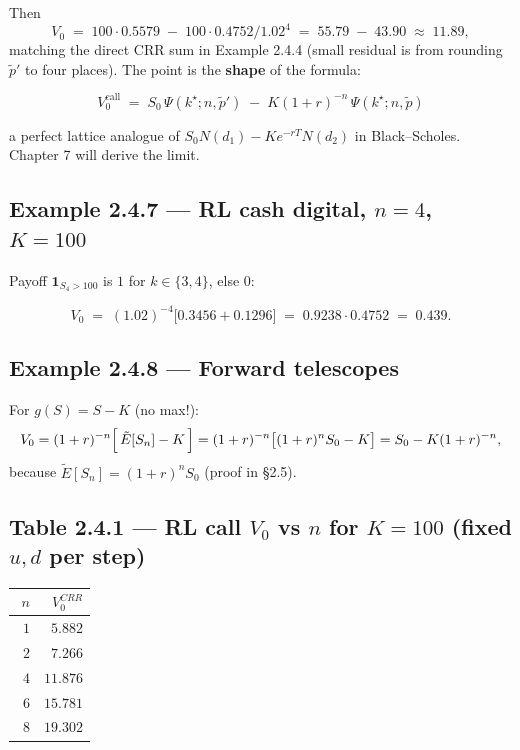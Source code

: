 \documentclass[
  10pt,
  twoside]{book}
\newcounter{none} %
\begin{document}
Then \[
V_0 \;=\; 100\cdot 0.5579 \;-\; 100\cdot 0.4752/1.02^4 \;=\; 55.79 \;-\; 43.90 \;\approx\; 11.89,
\] matching the direct CRR sum in Example 2.4.4 (small residual is from
rounding \(\tilde p'\) to four places). The point is the \textbf{shape}
of the formula:

\[
\boxed{\;V_0^{\text{call}} \;=\; S_0\,\Psi(k^\star; n, \tilde p') \;-\; K(1+r)^{-n}\,\Psi(k^\star; n, \tilde p)\;}
\]

a perfect lattice analogue of \(S_0 N(d_1) - Ke^{-rT}N(d_2)\) in
Black--Scholes. Chapter 7 will derive the limit.

\subsection{\texorpdfstring{Example 2.4.7 --- RL cash digital, \(n=4\),
\(K=100\)}{Example 2.4.7 --- RL cash digital, n=4, K=100}}\label{example-2.4.7-rl-cash-digital-n4-k100}

Payoff \(\mathbf 1_{S_4>100}\) is \(1\) for \(k\in\{3,4\}\), else 0:

\[
V_0 \;=\; (1.02)^{-4}\bigl[0.3456 + 0.1296\bigr] \;=\; 0.9238\cdot 0.4752 \;=\; 0.439.
\]

\subsection{Example 2.4.8 --- Forward
telescopes}\label{example-2.4.8-forward-telescopes}

For \(g(S)=S-K\) (no max!): \[
V_0 = (1+r)^{-n}\Bigl[\,\tilde E[S_n] - K\,\Bigr] = (1+r)^{-n}\bigl[(1+r)^n S_0 - K\bigr] = S_0 - K(1+r)^{-n},
\] because \(\tilde E[S_n] = (1+r)^n S_0\) (proof in §2.5).

\subsection{\texorpdfstring{Table 2.4.1 --- RL call \(V_0\) vs \(n\) for
\(K=100\) (fixed \(u,d\) per
step)}{Table 2.4.1 --- RL call V\_0 vs n for K=100 (fixed u,d per step)}}\label{table-2.4.1-rl-call-v_0-vs-n-for-k100-fixed-ud-per-step}

{\def\LTcaptype{none} %
\begin{table}[H]
\centering
\begin{tabular}{|r|r|}
\toprule
\(n\) & \(V_0^{CRR}\) \\
\midrule



\(\phantom{0}1\) & \(\phantom{0}5.882\) \\
\(\phantom{0}2\) & \(\phantom{0}7.266\) \\
\(\phantom{0}4\) & \(11.876\) \\
\(\phantom{0}6\) & \(15.781\) \\
\(\phantom{0}8\) & \(19.302\) \\
\bottomrule
\end{tabular}
\end{table}
}
\end{document}
